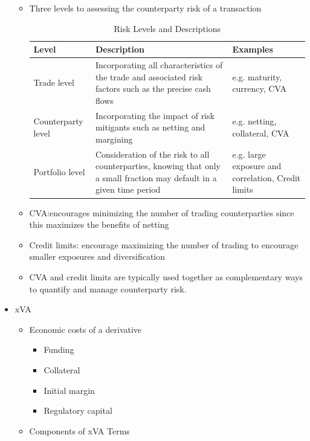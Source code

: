 \begin{itemize}
\begin{itemize}
    \item Three levels to assessing the counterparty risk of a
    transaction

    \begin{table}[h]
        \centering
        \begin{tabular}{|p{4cm}|p{6cm}|p{4cm}|}
            \hline
            \textbf{Level} & \textbf{Description} & \textbf{Examples} \\
            \hline
            Trade level & Incorporating all characteristics of the trade and associated risk factors such as the precise cash flows & e.g. maturity, currency, CVA \\
            \hline
            Counterparty level & Incorporating the impact of risk mitigants such as netting and margining & e.g. netting, collateral, CVA \\
            \hline
            Portfolio level & Consideration of the risk to all counterparties, knowing that only a small fraction may default in a given time period & e.g. large exposure and correlation, Credit limits \\
            \hline
        \end{tabular}
        \caption{Risk Levels and Descriptions}
    \end{table}


\item CVA:encourages minimizing the number of trading
counterparties since this maximizes the benefits of netting
\item Credit limits: encourage maximizing the number of trading to
encourage smaller exposures and diversification
\item CVA and credit limits are typically used together as
complementary ways to quantify and manage counterparty
risk.
\end{itemize}

\item xVA
\begin{itemize}
    \item Economic costs of a derivative
    \begin{itemize}
        \item Funding
        \item Collateral
        \item Initial margin
        \item Regulatory capital
    \end{itemize}
\item Components of xVA Terms


\end{itemize}
\end{itemize}
